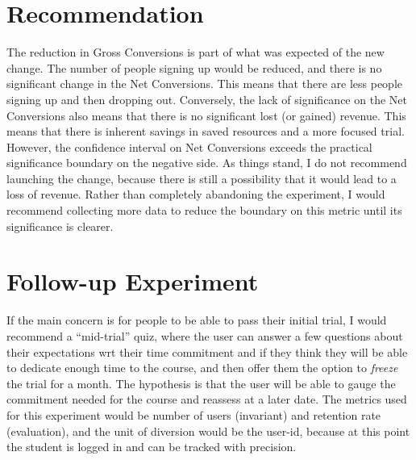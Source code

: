\documentclass[12pt,a4paper]{article}
\begin{document}
\section{Recommendation}
The reduction in Gross Conversions is part of what was expected of the new
change. The number of people signing up would be reduced, and there is no
significant change in the Net Conversions. This means that there are less people
signing up and then dropping out. Conversely, the lack of significance on the
Net Conversions also means that there is no significant lost (or gained)
revenue. This means that there is inherent savings in saved resources and a more
focused trial. However, the confidence interval on Net Conversions exceeds the
practical significance boundary on the negative side. As things stand, I do not
recommend launching the change, because there is still a possibility that it
would lead to a loss of revenue. Rather than completely abandoning the
experiment, I would recommend collecting more data to reduce the boundary on
this metric until its significance is clearer.

\section{Follow-up Experiment}
If the main concern is for people to be able to pass their initial trial, I
would recommend a ``mid-trial'' quiz, where the user can answer a few
questions about their expectations wrt their time commitment and if they think
they will be able to dedicate enough time to the course, and then offer them the
option to \emph{freeze} the trial for a month. The hypothesis is that the user
will be able to gauge the commitment needed for the course and reassess at a
later date.
The metrics used for this experiment would be number of users (invariant) and
retention rate (evaluation), and the unit of diversion would be the user-id,
because at this point the student is logged in and can be tracked with
precision.
\end{document}

